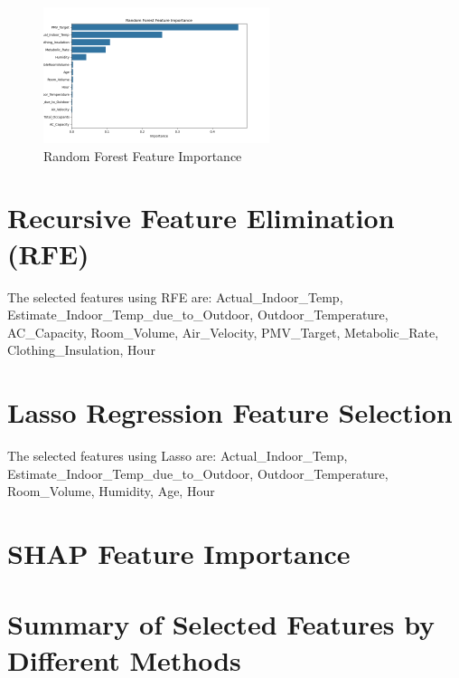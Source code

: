 \documentclass{article}%
\begin{document}
%


\begin{figure}[h!]%
\centering%
\includegraphics[width=250px]{rf_feature_importance.png}%
\caption{Random Forest Feature Importance}%
\end{figure}

%
\section{Recursive Feature Elimination (RFE)}%
\label{sec:RecursiveFeatureElimination(RFE)}%

%
The selected features using RFE are: Actual\_Indoor\_Temp, Estimate\_Indoor\_Temp\_due\_to\_Outdoor, Outdoor\_Temperature, AC\_Capacity, Room\_Volume, Air\_Velocity, PMV\_Target, Metabolic\_Rate, Clothing\_Insulation, Hour%
\section{Lasso Regression Feature Selection}%
\label{sec:LassoRegressionFeatureSelection}%

%
The selected features using Lasso are: Actual\_Indoor\_Temp, Estimate\_Indoor\_Temp\_due\_to\_Outdoor, Outdoor\_Temperature, Room\_Volume, Humidity, Age, Hour%
\section{SHAP Feature Importance}%
\label{sec:SHAPFeatureImportance}%

%
\section{Summary of Selected Features by Different Methods}%
\label{sec:SummaryofSelectedFeaturesbyDifferentMethods}%
\end{document}
